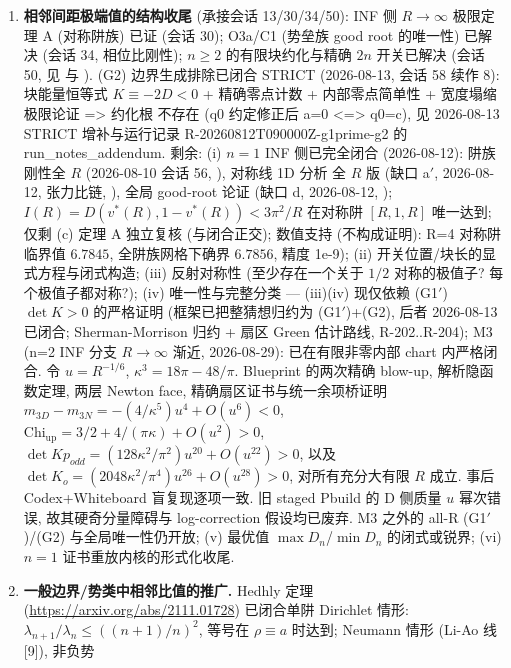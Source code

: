 \documentclass[UTF8]{ctexart}
\begin{document}
\begin{enumerate}
	\item \textbf{相邻间距极端值的结构收尾} (承接会话 13/30/34/50):
INF 侧 $R\to\infty$ 极限定理 A (对称阱族) 已证 (会话 30); O3a/C1
(势垒族 good root 的唯一性) 已解决 (会话 34, 相位比刚性);
$n\ge2$ 的有限块约化与精确 $2n$ 开关已解决 (会话 50, 见
 与
).
(G2) 边界生成排除已闭合 STRICT (2026-08-13, 会话 58 续作 8): 块能量恒等式
$K\equiv-2D<0$ + 精确零点计数 + 内部零点简单性 + 宽度塌缩极限论证 => 约化根
不存在 (q0 约定修正后 a=0 <=> q0=c), 见 
2026-08-13 STRICT 增补与运行记录 R-20260812T090000Z-g1prime-g2 的 run\_notes\_addendum.
剩余: (i) $n=1$ INF 侧已完全闭合 (2026-08-12): 阱族刚性全 $R$ (2026-08-10
会话 56, ), 对称线 1D 分析
全 $R$ 版 (缺口 a$'$, 2026-08-12, 张力比链, ),
全局 good-root 论证 (缺口 d, 2026-08-12, );
$I(R)=D(v^*(R),1-v^*(R))<3\pi^2/R$ 在对称阱 $[R,1,R]$ 唯一达到; 仅剩 (c) 定理 A
独立复核 (与闭合正交); 数值支持 (不构成证明): R=4 对称阱
临界值 $6.7845$, 全阱族网格下确界 $6.7856$, 精度 1e-9);
(ii) 开关位置/块长的显式方程与闭式构造;
(iii) 反射对称性 (至少存在一个关于 $1/2$ 对称的极值子? 每个极值子都对称?);
(iv) 唯一性与完整分类 --- (iii)(iv) 现仅依赖 (G1$'$) $\det K>0$ 的严格证明
(框架已把整猜想归约为 (G1$'$)+(G2), 后者 2026-08-13 已闭合; Sherman-Morrison
归约 + 扇区 Green 估计路线, R-202..R-204);
M3 (n=2 INF 分支 $R\to\infty$ 渐近, 2026-08-29): 已在有限非零内部 chart 内严格闭合.
令 $u=R^{-1/6}$, $\kappa^3=18\pi-48/\pi$. Blueprint 的两次精确 blow-up,
解析隐函数定理, 两层 Newton face, 精确扇区证书与统一余项桥证明
$m_{3D}-m_{3N}=-(4/\kappa^5)u^4+O(u^6)<0$,
$\mathrm{Chi}_{\mathrm{up}}=3/2+4/(\pi\kappa)+O(u^2)>0$,
$\det Kp_{odd}=(128\kappa^2/\pi^2)u^{20}+O(u^{22})>0$, 以及
$\det K_o=(2048\kappa^2/\pi^4)u^{26}+O(u^{28})>0$, 对所有充分大有限 $R$ 成立.
事后 Codex+Whiteboard 盲复现逐项一致. 旧 staged Pbuild 的 D 侧质量 $u$ 幂次错误,
故其硬奇分量障碍与 log-correction 假设均已废弃. M3 之外的 all-R (G1$'$)/(G2)
与全局唯一性仍开放;
(v) 最优值 $\max D_n$/$\min D_n$ 的闭式或锐界;
(vi) $n=1$ 证书重放内核的形式化收尾.
	\item \textbf{一般边界/势类中相邻比值的推广.}
		Hedhly 定理 (\url{https://arxiv.org/abs/2111.01728}) 已闭合单阱
		Dirichlet 情形: $\lambda_{n+1}/\lambda_n \le ((n+1)/n)^2$, 等号在
		$\rho\equiv a$ 时达到; Neumann 情形 (Li-Ao 线 [9]), 非负势

\end{enumerate}
\end{document}
